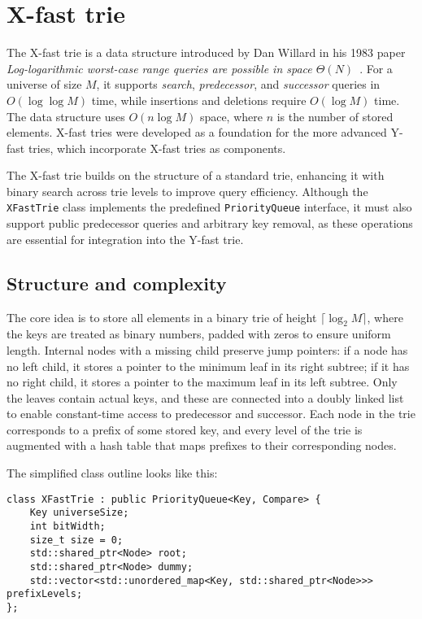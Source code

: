 \section{X-fast trie}
The X-fast trie is a data structure introduced by Dan Willard in his 1983 paper \emph{Log-logarithmic worst-case range queries are possible in space \( \Theta(N) \)}~\cite{Willard1983}. For a universe of size \( M \), it supports \emph{search}, \emph{predecessor}, and \emph{successor} queries in \( O(\log \log M) \) time, while insertions and deletions require \( O(\log M) \) time. The data structure uses \( O(n \log M) \) space, where \( n \) is the number of stored elements. X-fast tries were developed as a foundation for  the more advanced Y-fast tries, which incorporate X-fast tries as components.

The X-fast trie builds on the structure of a standard trie, enhancing it with binary search across trie levels to improve query efficiency. Although the \texttt{XFastTrie} class implements the predefined \texttt{PriorityQueue} interface, it must also support public predecessor queries and arbitrary key removal, as these operations are essential for integration into the Y-fast trie.

\subsection{Structure and complexity}
The core idea is to store all elements in a binary trie of height \( \lceil \log_2 M \rceil \), where the keys are treated as binary numbers, padded with zeros to ensure uniform length. Internal nodes with a missing child preserve jump pointers: if a node has no left child, it stores a pointer to the minimum leaf in its right subtree; if it has no right child, it stores a pointer to the maximum leaf in its left subtree. Only the leaves contain actual keys, and these are connected into a doubly linked list to enable constant-time access to predecessor and successor. Each node in the trie corresponds to a prefix of some stored key, and every level of the trie is augmented with a hash table that maps prefixes to their corresponding nodes.

The simplified class outline looks like this:
\begin{verbatim}
class XFastTrie : public PriorityQueue<Key, Compare> {
    Key universeSize;
    int bitWidth;
    size_t size = 0;
    std::shared_ptr<Node> root;
    std::shared_ptr<Node> dummy;
    std::vector<std::unordered_map<Key, std::shared_ptr<Node>>> prefixLevels;
};
\end{verbatim}

